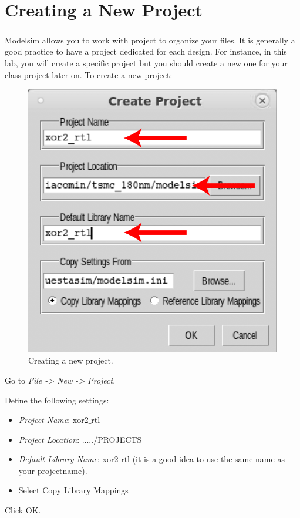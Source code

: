 \section{Creating a New Project}
Modelsim\textsuperscript{\tiny\textregistered} allows you to work with project to organize your files. It is generally a good practice to have a project dedicated for each design. For instance, in this lab, you will create a specific project but you should create a new one for your class project later on. To create a new project:
\begin{enumerate}
	\parbox[t]{\dimexpr\textwidth-\leftmargin}{%
	\begin{figure}
		\vspace{0mm}
		\centering
		\vspace{-\baselineskip}
		\includegraphics[scale=0.5]{figures/modelsim/create_project.pdf}
		\caption{Creating a new project.}
		\label{create}
	\end{figure}
	\item Go to \textit{File -> New -> Project}.
\item Define the following settings:
\begin{itemize}
	\item \textit{Project Name}:  xor2$\_$rtl
	\item \textit{Project Location}: ...../PROJECTS
	\item \textit{Default Library Name}: xor2$\_$rtl (it is a good idea to use the same name as your projectname).
	\item Select Copy Library Mappings
\end{itemize}
\item Click OK.
}
\end{enumerate}
		\vspace{10mm}




